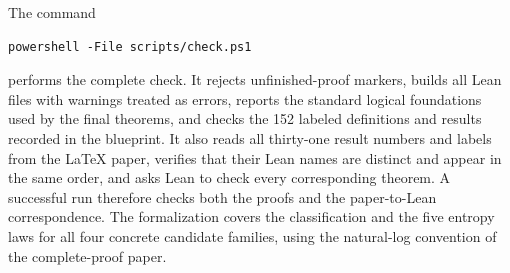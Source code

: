 \documentclass[aps,pra,11pt,onecolumn,nofootinbib,tightenlines]{revtex4-2}
\begin{document}
The command
\begin{verbatim}
powershell -File scripts/check.ps1
\end{verbatim}
performs the complete check. It rejects unfinished-proof markers, builds all
Lean files with warnings treated as errors, reports the standard logical
foundations used by the final theorems, and checks the 152 labeled definitions
and results recorded in the blueprint. It also reads all thirty-one result
numbers and labels from the LaTeX paper, verifies that their Lean names are
distinct and appear in the same order, and asks Lean to check every
corresponding theorem. A successful run therefore checks both the proofs and
the paper-to-Lean correspondence. The formalization covers the classification
and the five entropy laws for all four concrete candidate families, using the
natural-log convention of the complete-proof paper.


\renewcommand{\bibfont}{\footnotesize}

\end{document}
